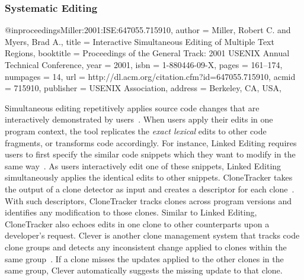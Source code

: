 \documentclass[runningheads,a4paper]{llncs}
\begin{document}
\subsubsection{Systematic Editing}
@inproceedings{Miller:2001:ISE:647055.715910,
 author = {Miller, Robert C. and Myers, Brad A.},
 title = {Interactive Simultaneous Editing of Multiple Text Regions},
 booktitle = {Proceedings of the General Track: 2001 USENIX Annual Technical Conference},
 year = {2001},
 isbn = {1-880446-09-X},
 pages = {161--174},
 numpages = {14},
 url = {http://dl.acm.org/citation.cfm?id=647055.715910},
 acmid = {715910},
 publisher = {USENIX Association},
 address = {Berkeley, CA, USA},
} 


Simultaneous editing repetitively applies source code changes that are interactively demonstrated by users~\cite{MiM2001}. When users apply their edits in one program context, the tool replicates the \emph{exact lexical} edits to other code fragments, or transforms code accordingly. For instance, Linked Editing requires users to first specify the similar code snippets which they want to modify in the same way~\cite{TBG2004}. As users interactively edit one of these snippets, Linked Editing simultaneously applies the identical edits to other snippets. 
CloneTracker takes the output of a clone detector as input and creates a descriptor for each clone~\cite{DuR2007}. With such descriptors, CloneTracker tracks clones across program versions and identifies any modification to those clones. 
Similar to Linked Editing, CloneTracker also echoes edits in one clone to other counterparts upon a developer's request. 
Clever is another clone management system that tracks code clone groups and detects any inconsistent change applied to clones within the same group~\cite{NNP2009}. If a clone misses the updates applied to the other clones in the same group, Clever automatically suggests the missing update to that clone.
\end{document}
